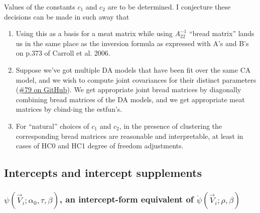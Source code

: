 \documentclass{article}
\begin{document}
Values of the constants $c_{1}$ and $c_{2}$ are to be determined.
I conjecture these decisions can be made in such away that
\begin{enumerate}
\item Using this as a basis for a meat matrix while using
  $A_{22}^{-1}$  ``bread matrix'' lands us in the same place as the
  inversion formula as expressed with A's and B's on p.373 of Carroll
  et al. 2006.
\item Suppose we've got multiple DA models that have been fit over the
  same CA model, and we wish to compute joint covariances for their
  distinct parameters
  (\href{https://github.com/benbhansen-stats/propertee/issues/79}{\#79
    on GitHub}). We get appropriate joint bread matrices by
  diagonally combining bread matrices of the DA models, and we get
  appropriate meat matrices by cbind-ing the estfun's.
\item For ``natural'' choices of $c_{1}$ and $c_{2}$, in the
  presence of clustering the corresponding bread matrices are
  reasonable and interpretable, at least in cases of HC0 and HC1
  degree of freedom adjustments.
\end{enumerate}

\subsection{Intercepts and intercept supplements}
\subsubsection{$\psi(\vec{V}_{i};
  \alpha_{0}, \tau, \beta)$, an intercept-form equivalent of $\grave{\psi}(\vec{V}_{i};
  \rho, \beta)$}
\label{sec:psit-rho_0-tau}
\end{document}
